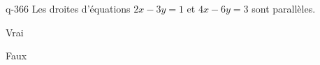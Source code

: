\begin{truefalse}{q-366}
Les droites d'équations $2x-3y=1$ et $4x-6y=3$ sont parallèles.
\item* Vrai
\item Faux
\end{truefalse}

